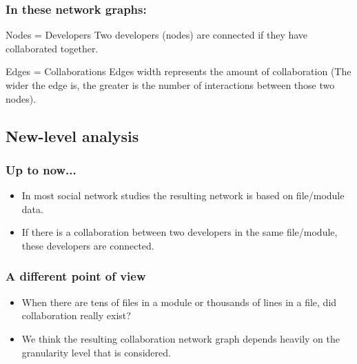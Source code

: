 \documentclass{beamer}
\begin{document}

\begin{frame}
\frametitle{In these network graphs:}
\begin{block}{Nodes = Developers}
Two developers (nodes) are connected if they have collaborated together.
\end{block}

\begin{block}{Edges = Collaborations}
Edges width represents the amount of collaboration
(The wider the edge is, the greater is the number of interactions between those two nodes).
\end{block}

\end{frame}


\subsection{New-level analysis} %

\begin{frame}
\frametitle{Up to now...}
\begin{itemize}
\item In most social network studies the resulting network is based on file/module data.
\item If there is a collaboration between two developers in the same file/module, these developers are connected.
\end{itemize}
\end{frame}


\begin{frame}
\frametitle{A different point of view}
\begin{itemize}
\item When there are tens of files in a module or thousands of lines in a file, did collaboration really exist?
\item We think the resulting collaboration network graph depends heavily on the granularity level that is considered.
\end{itemize}
\end{frame}

\end{document}
